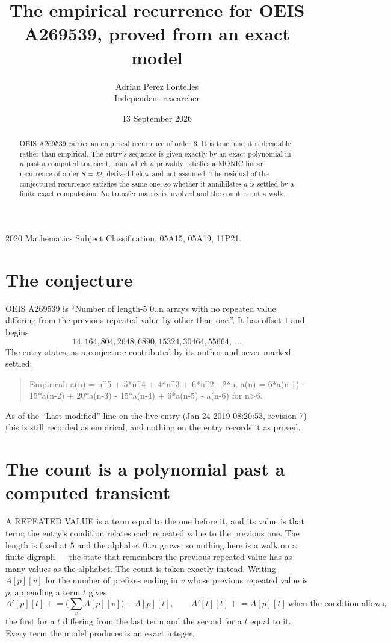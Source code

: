 \documentclass[11pt,a4paper]{article}
\title{The empirical recurrence for OEIS A269539, proved from an exact model}
\author{Adrian Perez Fontelles\\ \small Independent researcher}
\date{13 September 2026}
\theoremstyle{plain}
\theoremstyle{definition}
\begin{document}
\maketitle

\begin{abstract}
OEIS A269539 carries an empirical recurrence of order $6$. It is true, and it is
decidable rather than empirical. The entry's sequence is given exactly by an exact polynomial in $n$ past a computed transient, from
which $a$ provably satisfies a MONIC linear recurrence of order $S=22$, derived below and not
assumed. The residual of the conjectured recurrence satisfies the same one, so whether it
annihilates $a$ is settled by a finite exact computation. No transfer matrix is involved and
the count is not a walk.
\end{abstract}

\noindent\small 2020 Mathematics Subject Classification. 05A15, 05A19, 11P21.\normalsize

\section{The conjecture}

OEIS A269539 is ``Number of length-5 0..n arrays with no repeated value differing from the previous repeated value by other than one.''. It has offset $1$ and begins
\[
14, 164, 804, 2648, 6890, 15324, 30464, 55664,\ \dots
\]
The entry states, as a conjecture contributed by its author and never marked settled:
\begin{quote}
Empirical: a(n) = n\^{}5 + 5*n\^{}4 + 4*n\^{}3 + 6*n\^{}2 - 2*n. a(n) = 6*a(n-1) - 15*a(n-2) + 20*a(n-3) - 15*a(n-4) + 6*a(n-5) - a(n-6) for n>6.
\end{quote}
As of the ``Last modified'' line on the live entry (Jan 24 2019 08:20:53, revision 7)
this is still recorded as empirical, and nothing on the entry records it as proved.

\section{The count is a polynomial past a computed transient}

A REPEATED VALUE is a term equal to the one before it, and its value is that term; the entry's
condition relates each repeated value to the previous one. The length is fixed at $5$ and the
alphabet $0..n$ grows, so nothing here is a walk on a finite digraph --- the state that
remembers the previous repeated value has as many values as the alphabet. The count is taken
exactly instead. Writing $A[p][v]$ for the number of prefixes ending in $v$ whose previous
repeated value is $p$, appending a term $t$ gives
\[
A'[p][t] \mathrel{+}= \Big(\sum_v A[p][v]\Big) - A[p][t],
\qquad
A'[t][t] \mathrel{+}= A[p][t]\ \text{when the condition allows},
\]
the first for a $t$ differing from the last term and the second for a $t$ equal to it. Every
term the model produces is an exact integer.
\end{document}
